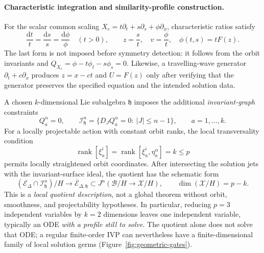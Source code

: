 \documentclass[12pt,a4paper,oneside]{report}
\numberwithin{equation}{chapter}
\theoremstyle{remark}\newtheorem{remark}[theorem]{Remark}
\begin{document}
\paragraph{Characteristic integration and similarity-profile construction.}
For the scalar common scaling
$X_c=t\partial_t+s\partial_s+\phi\partial_\phi$,
characteristic ratios satisfy
\begin{equation}\label{eq:scaling-characteristics}
 \frac{\mathrm dt}{t}=\frac{\mathrm ds}{s}
   =\frac{\mathrm d\phi}{\phi}\quad(t>0),\qquad
 z=\frac{s}{t},\quad v=\frac\phi t,\quad
 \phi(t,s)=tF(z).
\end{equation}
The last form is not imposed before symmetry detection: it follows from
the orbit invariants and $Q_{X_c}=\phi-t\phi_t-s\phi_s=0$.
Likewise, a travelling-wave generator $\partial_t+c\partial_x$
produces $z=x-ct$ and $U=F(z)$ only after verifying that the generator
preserves the specified equation and the intended solution data.

A chosen $k$-dimensional Lie subalgebra $\mathfrak h$ imposes the additional
\emph{invariant-graph} constraints
\begin{equation}\label{eq:Q-ideal}
 Q_a^\alpha=0,\qquad
 \mathcal I_{\mathfrak h}^n=
 \{D_JQ_a^\alpha=0:\ |J|\le n-1\},
 \qquad a=1,\ldots,k.
\end{equation}
For a locally projectable action with constant orbit ranks, the local
transversality condition
\begin{equation}\label{eq:transverse-rank}
 \operatorname{rank}[\xi_a^i]
 =\operatorname{rank}[\xi_a^i,\eta_a^\alpha]=k\le p
\end{equation}
permits locally straightened orbit coordinates. After intersecting the
solution jets with the invariant-surface ideal, the quotient has the
schematic form
\begin{equation}\label{eq:quotient-geometry}
 (\mathscr E_\Delta\cap\mathcal I_{\mathfrak h}^n)/H
 \longrightarrow \overline{\mathcal E}_{\Delta,\mathfrak h}
 \subset J^n(\mathcal B/H\to\mathcal X/H),
 \qquad \dim(\mathcal X/H)=p-k.
\end{equation}
This is a \emph{local quotient description}, not a global theorem without
orbit, smoothness, and projectability hypotheses. In particular, reducing
$p=3$ independent variables by $k=2$ dimensions leaves one independent
variable, typically an ODE \emph{with a profile still to solve}. The
quotient alone does not solve that ODE; a regular finite-order IVP can
nevertheless have a finite-dimensional family of local solution germs
(Figure~\ref{fig:geometric-gates}).
\end{document}
